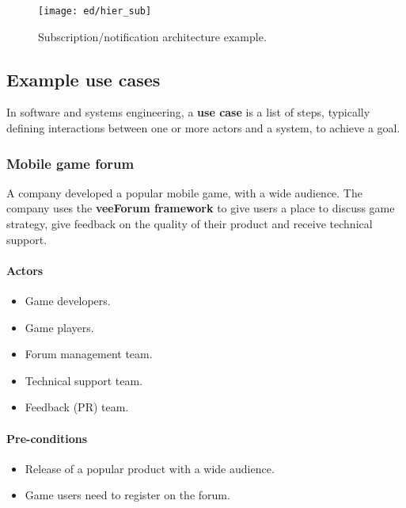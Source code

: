 \documentclass[12pt]{report}
\renewcommand\emph{\textbf}
\begin{document}
                    \begin{figure}[!htb]
                    \caption{Subscription/notification architecture example.}
                    \centering
                    \texttt{[image: ed/hier\_sub]}
                    \end{figure}

            \newpage

            \subsection{Example use cases}
                In software and systems engineering, a \emph{use case} is a list of steps, typically defining interactions between one or more actors and a system, to achieve a goal.

                \subsubsection{Mobile game forum}
                    A company developed a popular mobile game, with a wide audience.
                    The company uses the \emph{veeForum framework} to give users a place to discuss game strategy, give feedback on the quality of their product and receive technical support.

                    \paragraph{Actors}
                        \begin{itemize}
                            \item Game developers.
                            \item Game players.
                            \item Forum management team.
                            \item Technical support team.
                            \item Feedback (PR) team.
                        \end{itemize}

                    \paragraph{Pre-conditions}
                        \begin{itemize}
                            \item Release of a popular product with a wide audience.
                            \item Game users need to register on the forum.
                        \end{itemize}
\end{document}
